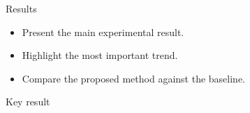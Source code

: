 \begin{frame}{Results}

\begin{itemize}
    \item Present the main experimental result.
    \item Highlight the most important trend.
    \item Compare the proposed method against the baseline.
\end{itemize}

\vspace{0.45cm}

\begin{block}{Key result}
\end{block}

\end{frame}
